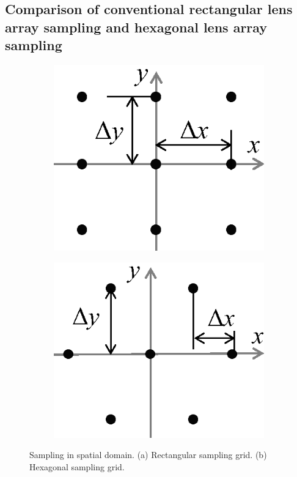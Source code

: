\documentclass[10pt,letterpaper]{article}
\begin{document}
\subsection{Comparison of conventional rectangular lens array sampling and hexagonal lens array sampling}
\begin{figure}[htb]
\centering
	\captionsetup[subfigure]{justification=centering}
	\begin{subfigure}[b]{0.3\linewidth}
	\centering
	\includegraphics[width=1\columnwidth]{fig2_a}
	\caption{}
	\end{subfigure}
	\begin{subfigure}[b]{0.3\linewidth}
	\includegraphics[width=1\columnwidth]{fig2_b}
	\centering
	\caption{}
	\end{subfigure}
\caption{Sampling in spatial domain. (a) Rectangular sampling grid. (b) Hexagonal sampling grid.}
\label{fig_2}
\end{figure}
\end{document}
